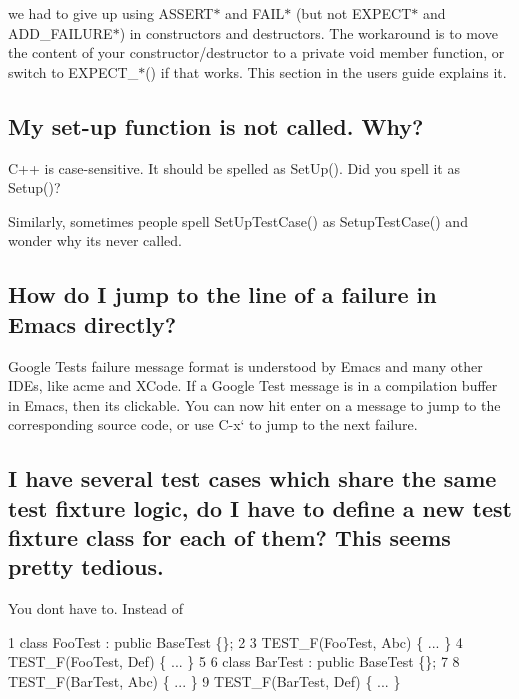 we had to give up using {\ttfamily A\+S\+S\+E\+R\+T$\ast$} and {\ttfamily F\+A\+I\+L$\ast$} (but not {\ttfamily E\+X\+P\+E\+C\+T$\ast$} and {\ttfamily A\+D\+D\+\_\+\+F\+A\+I\+L\+U\+R\+E$\ast$}) in constructors and destructors. The workaround is to move the content of your constructor/destructor to a private void member function, or switch to {\ttfamily E\+X\+P\+E\+C\+T\+\_\+$\ast$()} if that works. This section in the user\textquotesingle{}s guide explains it.

\subsection*{My set-\/up function is not called. Why?}

C++ is case-\/sensitive. It should be spelled as {\ttfamily Set\+Up()}. Did you spell it as {\ttfamily Setup()}?

Similarly, sometimes people spell {\ttfamily Set\+Up\+Test\+Case()} as {\ttfamily Setup\+Test\+Case()} and wonder why it\textquotesingle{}s never called.

\subsection*{How do I jump to the line of a failure in Emacs directly?}

Google Test\textquotesingle{}s failure message format is understood by Emacs and many other I\+D\+Es, like acme and X\+Code. If a Google Test message is in a compilation buffer in Emacs, then it\textquotesingle{}s clickable. You can now hit {\ttfamily enter} on a message to jump to the corresponding source code, or use {\ttfamily C-\/x}` to jump to the next failure.

\subsection*{I have several test cases which share the same test fixture logic, do I have to define a new test fixture class for each of them? This seems pretty tedious.}

You don\textquotesingle{}t have to. Instead of


\begin{DoxyCode}
1 class FooTest : public BaseTest \{\};
2 
3 TEST\_F(FooTest, Abc) \{ ... \}
4 TEST\_F(FooTest, Def) \{ ... \}
5 
6 class BarTest : public BaseTest \{\};
7 
8 TEST\_F(BarTest, Abc) \{ ... \}
9 TEST\_F(BarTest, Def) \{ ... \}
\end{DoxyCode}


